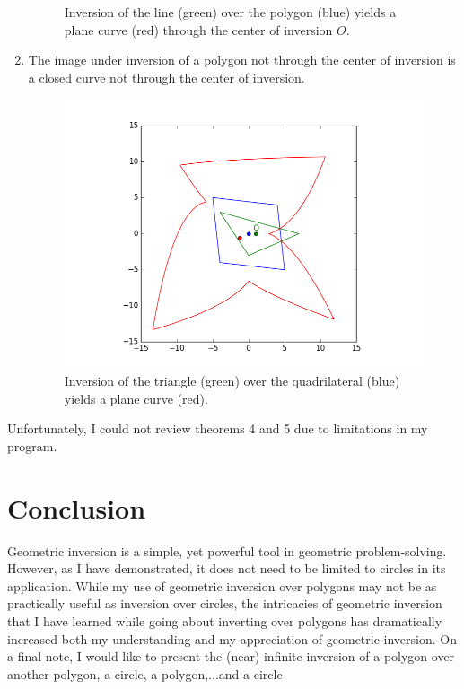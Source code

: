 \documentclass[a4paper,12pt]{article}
\numberwithin{figure}{section}
\begin{document}
\begin{enumerate}[leftmargin=25mm,label=\textbf{Theorem \arabic*:}]
\begin{figure}[H]
                \caption{Inversion of the line (green) over the polygon (blue) yields a plane curve (red) through the center of inversion $O$.}
                \label{fig:lpoffset}
            \end{figure}
            \item The image under inversion of a polygon not through the center of inversion is a closed curve not through the center of inversion.
            \begin{figure}[H]
                \centering                    \includegraphics[scale=0.6]{./pictures/INVERT_POLYOFFC_POLY}
                \caption{Inversion of the triangle (green) over the quadrilateral (blue) yields a plane curve (red).}
                \label{fig:coffcenter}
            \end{figure}
        \end{enumerate}
        
        Unfortunately, I could not review theorems 4 and 5 due to limitations in my program.
            
    \section{Conclusion}
    
        Geometric inversion is a simple, yet powerful tool in geometric problem-solving. However, as I have demonstrated, it does not need to be limited to circles in its application. While my use of geometric inversion over polygons may not be as practically useful as inversion over circles, the intricacies of geometric inversion that I have learned while going about inverting over polygons has dramatically increased both my understanding and my appreciation of geometric inversion. On a final note, I would like to present the (near) infinite inversion of a polygon over another polygon, a circle, a polygon,...and a circle
        
\end{document}
